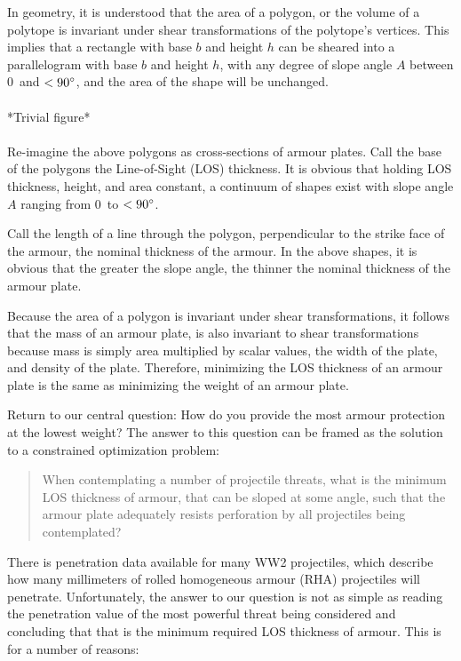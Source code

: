 \documentclass[]{article}
\begin{document}
In geometry, it is understood that the area of a polygon, or the volume of a polytope is invariant under shear transformations of the polytope’s vertices. This implies that a rectangle with base $b$ and height $h$ can be sheared into a parallelogram with base $b$ and height $h$, with any degree of slope angle $A$ between 0\degree\ and $<90\degree$, and the area of the shape will be unchanged.
\\\\
*Trivial figure*
\\\\
Re-imagine the above polygons as cross-sections of armour plates. Call the base of the polygons the Line-of-Sight (LOS) thickness. It is obvious that holding LOS thickness, height, and area constant, a continuum of shapes exist with slope angle $A$ ranging from 0\degree\ to $<90\degree$.

Call the length of a line through the polygon, perpendicular to the strike face of the armour, the nominal thickness of the armour. In the above shapes, it is obvious that the greater the slope angle, the thinner the nominal thickness of the armour plate.

Because the area of a polygon is invariant under shear transformations, it follows that the mass of an armour plate, is also invariant to shear transformations because mass is simply area multiplied by scalar values, the width of the plate, and density of the plate. Therefore, minimizing the LOS thickness of an armour plate is the same as minimizing the weight of an armour plate.

Return to our central question: How do you provide the most armour protection at the lowest weight? The answer to this question can be framed as the solution to a constrained optimization problem:
\\
\begin{quote}
When contemplating a number of projectile threats, what is the minimum LOS thickness of armour, that can be sloped at some angle, such that the armour plate adequately resists perforation by all projectiles being contemplated?\\
\end{quote}

\noindent There is penetration data available for many WW2 projectiles, which describe how many millimeters of rolled homogeneous armour (RHA) projectiles will penetrate. Unfortunately, the answer to our question is not as simple as reading the penetration value of the most powerful threat being considered and concluding that that is the minimum required LOS thickness of armour. This is for a number of reasons:
\end{document}
